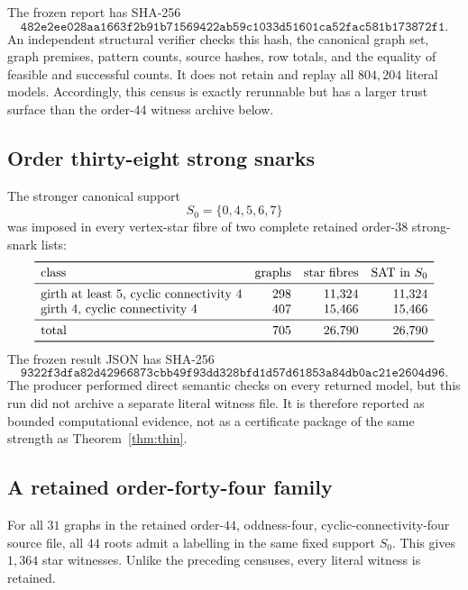 \documentclass[11pt]{article}
\theoremstyle{definition}
\theoremstyle{remark}
\newcommand{\1}{\mathbf 1}
\begin{document}
The frozen report has SHA-256
\[
\texttt{482e2ee028aa1663f2b91b71569422ab59c1033d51601ca52fac581b173872f1}.
\]
An independent structural verifier checks this hash, the canonical graph
set, graph premises, pattern counts, source hashes, row totals, and the
equality of feasible and successful counts.  It does not retain and replay
all \(804{,}204\) literal models.  Accordingly, this census is exactly
rerunnable but has a larger trust surface than the order-44 witness archive
below.

\subsection{Order thirty-eight strong snarks}

The stronger canonical support
\[
 S_0=\{0,4,5,6,7\}                                       \tag{8.1}
\]
was imposed in every vertex-star fibre of two complete retained
order-\(38\) strong-snark lists:
\[
\begin{array}{lrrr}
\toprule
\text{class}&\text{graphs}&\text{star fibres}&\text{SAT in \(S_0\)}\\
\midrule
\text{girth at least \(5\), cyclic connectivity \(4\)}
 &298&11{,}324&11{,}324\\
\text{girth \(4\), cyclic connectivity \(4\)}
 &407&15{,}466&15{,}466\\
\midrule
\text{total}&705&26{,}790&26{,}790\\
\bottomrule
\end{array}
\]
The frozen result JSON has SHA-256
\[
\texttt{9322f3dfa82d42966873cbb49f93dd328bfd1d57d61853a84db0ac21e2604d96}.
\]
The producer performed direct semantic checks on every returned model, but
this run did not archive a separate literal witness file.  It is therefore
reported as bounded computational evidence, not as a certificate package
of the same strength as Theorem~\ref{thm:thin}.

\subsection{A retained order-forty-four family}

For all \(31\) graphs in the retained order-\(44\), oddness-four,
cyclic-connectivity-four source file, all \(44\) roots admit a labelling in
the same fixed support \(S_0\).  This gives \(1{,}364\) star witnesses.
Unlike the preceding censuses, every literal witness is retained.
\end{document}
